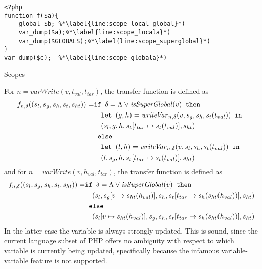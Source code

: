 \begin{program}
\begin{lstlisting}
<?php
function f($a){
	global $b; %*\label{line:scope_local_global}*)
	var_dump($a);%*\label{line:scope_locala}*)
	var_dump($GLOBALS);%*\label{line:scope_superglobal}*)
}
var_dump($c);  %*\label{line:scope_globala}*)
\end{lstlisting}
\caption{Scopes}
\label{lst:scope}
\end{program}

For $n = \mathit{varWrite}(v,t_{val},t_{tar})$, the transfer function is defined as
\begin{align}
f_{n, \delta} ((s_l,s_g,s_h,s_t, s_{ht})) = &\texttt{if }\delta = \Lambda \vee \mathit{isSuperGlobal}(v)\texttt{ then } \notag\\
                                            &\quad\texttt{let } (g,h) = \mathit{writeVar}_{n,\delta}(v, s_g, s_h, s_t(t_{val})) \texttt{ in }\notag\\
                                            &\quad (s_l,g,h,s_t[t_{tar}\mapsto s_t(t_{val})], s_{ht})\notag\\
                                            & \texttt{ else } \notag\\
                                            &\quad\texttt{let } (l,h) = \mathit{writeVar}_{n,\delta}(v, s_l, s_h, s_t(t_{val})) \texttt{ in }\notag\\
                                            &\quad (l,s_g,h,s_t[t_{tar}\mapsto s_t(t_{val})], s_{ht})
\end{align}
and for $n = \mathit{varWrite}(v,h_{val},t_{tar})$, the transfer function is defined as
\begin{align}
f_{n, \delta} ((s_l,s_g,s_h,s_t, s_{ht})) = &\texttt{if }\delta = \Lambda \vee \mathit{isSuperGlobal}(v)\texttt{ then } \notag\\
                                            &\quad (s_l,s_g[v\mapsto s_{ht}(h_{val})],s_h,s_t[t_{tar}\mapsto s_h(s_{ht}(h_{val}))], s_{ht})\notag\\
                                            & \texttt{ else } \notag\\
                                            &\quad (s_l[v\mapsto s_{ht}(h_{val})],s_g,s_h,s_t[t_{tar}\mapsto s_h(s_{ht}(h_{val}))], s_{ht})
\end{align}
In the latter case the variable is always strongly updated. This is sound, since the current language subset of PHP offers no ambiguity with respect to which variable is currently being updated, specifically because the infamous variable-variable feature is not supported.

